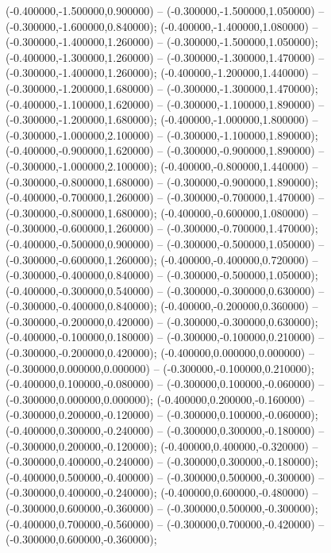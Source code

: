  (-0.400000,-1.500000,0.900000) -- (-0.300000,-1.500000,1.050000) -- (-0.300000,-1.600000,0.840000);
 (-0.400000,-1.400000,1.080000) -- (-0.300000,-1.400000,1.260000) -- (-0.300000,-1.500000,1.050000);
 (-0.400000,-1.300000,1.260000) -- (-0.300000,-1.300000,1.470000) -- (-0.300000,-1.400000,1.260000);
 (-0.400000,-1.200000,1.440000) -- (-0.300000,-1.200000,1.680000) -- (-0.300000,-1.300000,1.470000);
 (-0.400000,-1.100000,1.620000) -- (-0.300000,-1.100000,1.890000) -- (-0.300000,-1.200000,1.680000);
 (-0.400000,-1.000000,1.800000) -- (-0.300000,-1.000000,2.100000) -- (-0.300000,-1.100000,1.890000);
 (-0.400000,-0.900000,1.620000) -- (-0.300000,-0.900000,1.890000) -- (-0.300000,-1.000000,2.100000);
 (-0.400000,-0.800000,1.440000) -- (-0.300000,-0.800000,1.680000) -- (-0.300000,-0.900000,1.890000);
 (-0.400000,-0.700000,1.260000) -- (-0.300000,-0.700000,1.470000) -- (-0.300000,-0.800000,1.680000);
 (-0.400000,-0.600000,1.080000) -- (-0.300000,-0.600000,1.260000) -- (-0.300000,-0.700000,1.470000);
 (-0.400000,-0.500000,0.900000) -- (-0.300000,-0.500000,1.050000) -- (-0.300000,-0.600000,1.260000);
 (-0.400000,-0.400000,0.720000) -- (-0.300000,-0.400000,0.840000) -- (-0.300000,-0.500000,1.050000);
 (-0.400000,-0.300000,0.540000) -- (-0.300000,-0.300000,0.630000) -- (-0.300000,-0.400000,0.840000);
 (-0.400000,-0.200000,0.360000) -- (-0.300000,-0.200000,0.420000) -- (-0.300000,-0.300000,0.630000);
 (-0.400000,-0.100000,0.180000) -- (-0.300000,-0.100000,0.210000) -- (-0.300000,-0.200000,0.420000);
 (-0.400000,0.000000,0.000000) -- (-0.300000,0.000000,0.000000) -- (-0.300000,-0.100000,0.210000);
 (-0.400000,0.100000,-0.080000) -- (-0.300000,0.100000,-0.060000) -- (-0.300000,0.000000,0.000000);
 (-0.400000,0.200000,-0.160000) -- (-0.300000,0.200000,-0.120000) -- (-0.300000,0.100000,-0.060000);
 (-0.400000,0.300000,-0.240000) -- (-0.300000,0.300000,-0.180000) -- (-0.300000,0.200000,-0.120000);
 (-0.400000,0.400000,-0.320000) -- (-0.300000,0.400000,-0.240000) -- (-0.300000,0.300000,-0.180000);
 (-0.400000,0.500000,-0.400000) -- (-0.300000,0.500000,-0.300000) -- (-0.300000,0.400000,-0.240000);
 (-0.400000,0.600000,-0.480000) -- (-0.300000,0.600000,-0.360000) -- (-0.300000,0.500000,-0.300000);
 (-0.400000,0.700000,-0.560000) -- (-0.300000,0.700000,-0.420000) -- (-0.300000,0.600000,-0.360000);
